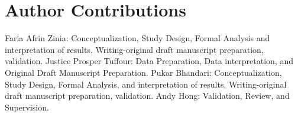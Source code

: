 \documentclass[numbered]{trbunofficial}
\begin{document}
\section{Author Contributions}

 Faria Afrin Zinia: Conceptualization, Study Design, Formal Analysis and interpretation of results. Writing-original draft manuscript preparation, validation. Justice Prosper Tuffour: Data Preparation, Data interpretation, and Original Draft Manuscript Preparation. Pukar Bhandari: Conceptualization, Study Design, Formal Analysis, and interpretation of results. Writing-original draft manuscript preparation, validation. Andy Hong:  Validation, Review, and Supervision.

\newpage



\end{document}

